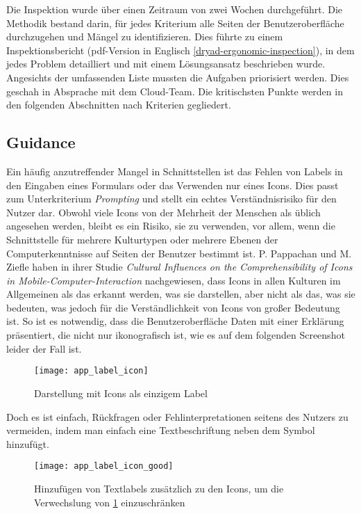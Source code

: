 
Die Inspektion wurde über einen Zeitraum von zwei Wochen durchgeführt. Die Methodik bestand darin, für jedes Kriterium alle Seiten der Benutzeroberfläche durchzugehen und Mängel zu identifizieren.
Dies führte zu einem Inspektionsbericht (pdf-Version in Englisch \ref{dryad-ergonomic-inspection}), in dem jedes Problem detailliert und mit einem Lösungsansatz beschrieben wurde. Angesichts der umfassenden Liste mussten die Aufgaben priorisiert werden.
Dies geschah in Absprache mit dem Cloud-Team.
Die kritischsten Punkte werden in den folgenden Abschnitten nach Kriterien gegliedert.

\subsection{Guidance} \label{sec:guidance}

Ein häufig anzutreffender Mangel in Schnittstellen ist das Fehlen von Labels in den Eingaben eines Formulars oder das Verwenden nur eines Icons.
Dies passt zum Unterkriterium \textit{Prompting} und stellt ein echtes Verständnisrisiko für den Nutzer dar.
Obwohl viele Icons von der Mehrheit der Menschen als üblich angesehen werden, bleibt es ein Risiko, sie zu verwenden, vor allem, wenn die Schnittstelle für mehrere Kulturtypen oder mehrere Ebenen der Computerkenntnisse auf Seiten der Benutzer bestimmt ist.
P. Pappachan und M. Ziefle haben in ihrer Studie \textit{Cultural Influences on the Comprehensibility of Icons in Mobile-Computer-Interaction}\cite{iconsCultureInfluence} nachgewiesen, dass Icons in allen Kulturen im Allgemeinen als das erkannt werden, was sie darstellen, aber nicht als das, was sie bedeuten, was jedoch für die Verständlichkeit von Icons von großer Bedeutung ist.
So ist es notwendig, dass die Benutzeroberfläche Daten mit einer Erklärung präsentiert, die nicht nur ikonografisch ist, wie es auf dem folgenden Screenshot leider der Fall ist.

\begin{figure}[H]
  \centering
  \texttt{[image: app\_label\_icon]}
  \caption{Darstellung mit Icons als einzigem Label}
  \label{fig:app_label_icon}
\end{figure}

Doch es ist einfach, Rückfragen oder Fehlinterpretationen seitens des Nutzers zu vermeiden, indem man einfach eine Textbeschriftung neben dem Symbol hinzufügt.

\begin{figure}[H]
  \centering
  \texttt{[image: app\_label\_icon\_good]}
  \caption{Hinzufügen von Textlabels zusätzlich zu den Icons, um die Verwechslung von \ref{fig:app_label_icon} einzuschränken}
\end{figure}



